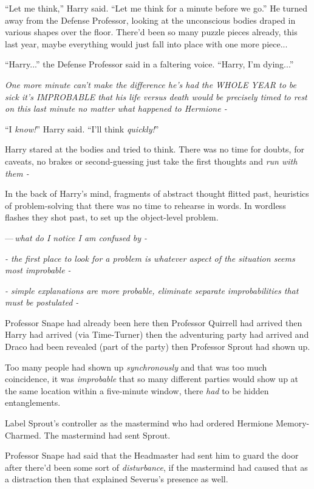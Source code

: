 ``Let me think,'' Harry said. ``Let me think for a minute before we go.'' He turned away from the Defense Professor, looking at the unconscious bodies draped in various shapes over the floor. There'd been so many puzzle pieces already, this last year, maybe everything would just fall into place with one more piece...

``Harry...'' the Defense Professor said in a faltering voice. ``Harry, I'm dying...''

\emph{One more minute can't make the difference he's had the WHOLE YEAR to be sick it's IMPROBABLE that his life versus death would be precisely timed to rest on this last minute no matter what happened to Hermione -}

``I \emph{know!}'' Harry said. ``I'll think \emph{quickly!}''

Harry stared at the bodies and tried to think. There was no time for doubts, for caveats, no brakes or second-guessing just take the first thoughts and \emph{run with them -}

In the back of Harry's mind, fragments of abstract thought flitted past, heuristics of problem-solving that there was no time to rehearse in words. In wordless flashes they shot past, to set up the object-level problem.

---\,\emph{what do I notice I am confused by -}

\emph{- the first place to look for a problem is whatever aspect of the situation seems most improbable -}

\emph{- simple explanations are more probable, eliminate separate improbabilities that must be postulated -}

Professor Snape had already been here then Professor Quirrell had arrived then Harry had arrived (via Time-Turner) then the adventuring party had arrived and Draco had been revealed (part of the party) then Professor Sprout had shown up.

Too many people had shown up \emph{synchronously} and that was too much coincidence, it was \emph{improbable} that so many different parties would show up at the same location within a five-minute window, there \emph{had} to be hidden entanglements.

Label Sprout's controller as the mastermind who had ordered Hermione Memory-Charmed. The mastermind had sent Sprout.

Professor Snape had said that the Headmaster had sent him to guard the door after there'd been some sort of \emph{disturbance}, if the mastermind had caused that as a distraction then that explained Severus's presence as well.

